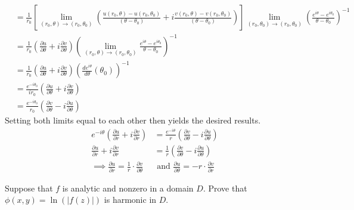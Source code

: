 \documentclass[12pt]{article}
\newenvironment{problem}[2][Problem]{\begin{trivlist}
\item[\hskip \labelsep {\bfseries #1} \hskip \labelsep {\bfseries #2.}]}{\end{trivlist}}
\begin{document}
\begin{problem}{2}
\begin{align*}
			&= \frac{1}{r_0}\left[\lim_{(r_0,\theta) \to (r_0,\theta_0)} \left(\frac{u(r_0,\theta) - u(r_0,\theta_0)}{(\theta - \theta_0)} + i\frac{v(r_0,\theta) - v(r_0,\theta_0)}{(\theta - \theta_0)}\right)\right]\lim_{(r_0,\theta_0) \to (r_0,\theta_0)} \left(\frac{e^{i\theta} - e^{i\theta_0}}{\theta - \theta_0}\right)^{-1} \\
			&= \frac{1}{r_0}\left(\frac{\partial u}{\partial \theta} + i\frac{\partial v}{\partial \theta}\right)\left(\lim_{(r_0,\theta) \to (r_0,\theta_0)}\frac{e^{i\theta} - e^{i\theta_0}}{\theta - \theta_0}\right)^{-1} \\
			&= \frac{1}{r_0}\left(\frac{\partial u}{\partial \theta} + i\frac{\partial v}{\partial \theta}\right)\left(\frac{de^{i\theta}}{d\theta}(\theta_0)\right)^{-1} \\
			&= \frac{e^{-i\theta_0}}{ir_0}\left(\frac{\partial u}{\partial \theta} + i\frac{\partial v}{\partial \theta}\right) \\
			&= \frac{e^{-i\theta_0}}{r_0}\left(\frac{\partial v}{\partial \theta} - i\frac{\partial u}{\partial \theta}\right)
	\end{align*}
	Setting both limits equal to each other then yields the desired results.
	\begin{align*}
		e^{-i\theta}\left(\frac{\partial u}{\partial r} + i\frac{\partial v}{\partial r}\right) &= \frac{e^{-i\theta}}{r}\left(\frac{\partial v}{\partial \theta} - i\frac{\partial u}{\partial \theta}\right) \\
		\frac{\partial u}{\partial r} + i\frac{\partial v}{\partial r} &= \frac{1}{r}\left(\frac{\partial v}{\partial \theta} - i\frac{\partial u}{\partial \theta}\right) \\
		\implies \frac{\partial u}{\partial r} = \frac{1}{r} \cdot \frac{\partial v}{\partial \theta} &\text{ and } \frac{\partial u}{\partial \theta} = -r \cdot \frac{\partial v}{\partial r}
	\end{align*}
\end{problem}
\begin{problem}{3}
	Suppose that $f$ is analytic and nonzero in a domain $D$. Prove that $\phi(x,y) = \ln(|f(z)|)$ is harmonic in $D$.
\end{problem}
\end{document}

